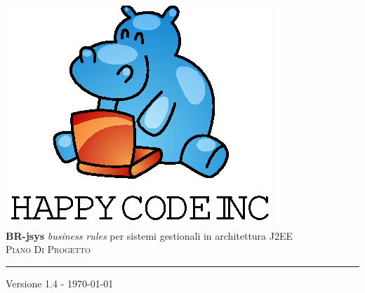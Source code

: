 \documentclass[11pt,titlepage,a4paper]{report}
\begin{document}
\newcommand{\lv}{ 1.4 } %
\newcommand{\dt}{ Piano Di Progetto }%
\newcommand{\Glossario}{ Glossario.1.4.pdf }


\begin{titlepage}\begin{center}
\vspace*{0.5in}
\includegraphics{logo.eps}
\vspace*{0.2in} \\
{\Large \textbf{BR-jsys}}
{\Large \emph{business rules} per sistemi gestionali in architettura J2EE } 
\vspace{2in} \\
\Huge \textsc{ \dt }
\par\rule{10cm}{0.4pt} \par {\large Versione \lv - \today} \\
\end{center}\end{titlepage}
\vspace*{0.5in}
\end{document}
